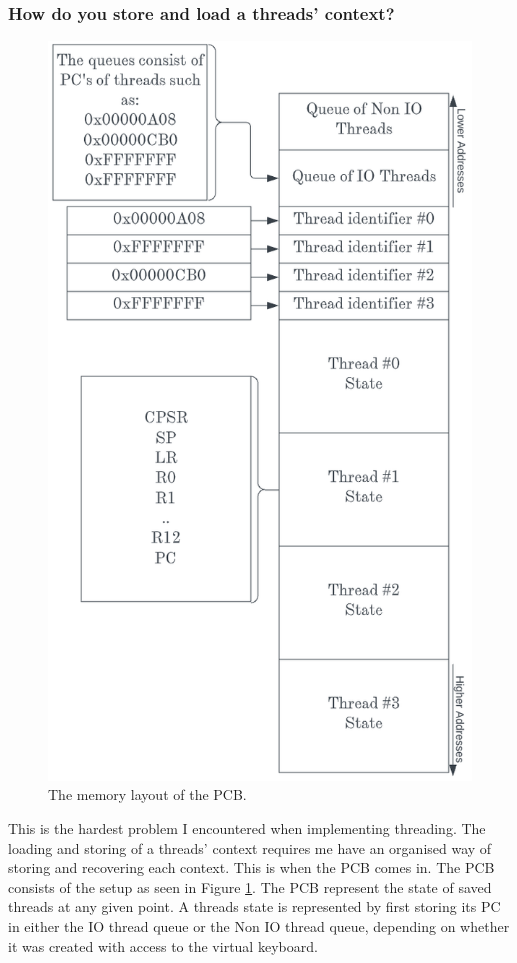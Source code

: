\subsubsection{How do you store and load a threads' context?}


\begin{figure}\centering
	\includegraphics[scale=0.335]{figures/PCB.png}
	\caption{The memory layout of the PCB.}
	\label{fig:PCB}
\end{figure} 
This is the hardest problem I encountered when implementing threading. The loading and storing of a threads' context requires me have an organised way of storing and recovering each context. This is when the PCB comes in. The PCB consists of the setup as seen in  Figure \ref{fig:PCB}. The PCB represent the state of saved threads at any given point. A threads state is represented by first storing its PC in either the IO thread queue or the Non IO thread queue, depending on whether it was created with access to the virtual keyboard.
